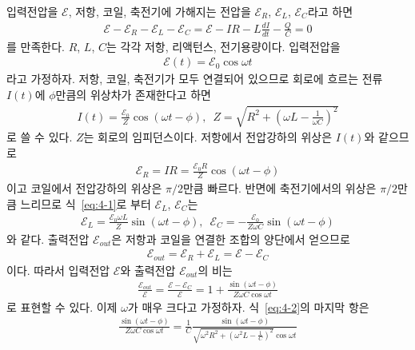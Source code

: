 \documentclass[tightenlines,floatfix,nofootinbib,superscriptaddress,fleqn]{revtex4}
\begin{document}
입력전압을 $\mathcal{E}$, 저항, 코일, 축전기에 가해지는 전압을 $\mathcal{E}_R$,
$\mathcal{E}_L$, $\mathcal{E}_C$라고 하면
\begin{align}\label{eq:4-1}
  \mathcal{E} - \mathcal{E}_R - \mathcal{E}_L - \mathcal{E}_C
  =\mathcal{E} - IR - L\frac{d I}{dt} -\frac{Q}{C}  =0
\end{align}
를 만족한다. $R$, $L$, $C$는 각각 저항, 리액턴스, 전기용량이다. 입력전압을
\begin{align}
  \mathcal{E}(t) = \mathcal{E}_0\cos\omega t
\end{align}
라고 가정하자. 저항, 코일, 축전기가 모두 연결되어 있으므로 회로에 흐르는 전류 $I(t)$에
$\phi$만큼의 위상차가 존재한다고 하면
\begin{align}
  I(t) = \frac{\mathcal{E}_0}{Z}\cos(\omega t-\phi),\,\,\,
  Z = \sqrt{R^2+\left(\omega L-\frac{1}{\omega C}\right)^2}
\end{align}
로 쓸 수 있다. $Z$는 회로의 임피던스이다. 저항에서 전압강하의 위상은 $I(t)$와 같으므로
\begin{align}
  \mathcal{E}_R = IR = \frac{\mathcal{E}_0 R}{Z}\cos(\omega t-\phi)
\end{align}
이고 코일에서 전압강하의 위상은 $\pi/2$만큼 빠르다. 반면에 축전기에서의 위상은 
$\pi/2$만큼 느리므로 식~\eqref{eq:4-1}로 부터
$\mathcal{E}_L$, $\mathcal{E}_C$는
\begin{align}
  \mathcal{E}_L = \frac{\mathcal{E}_0\omega L}{Z}\sin(\omega t-\phi) ,\,\,\,
  \mathcal{E}_C = -\frac{\mathcal{E}_0}{Z\omega C}\sin(\omega t-\phi) 
\end{align}
와 같다. 출력전압 $\mathcal{E}_{out}$은 저항과 코일을 연결한 조합의 양단에서 얻으므로
\begin{align}
  \mathcal{E}_{out} = \mathcal{E}_R+\mathcal{E}_L
  =\mathcal{E}-\mathcal{E}_C
\end{align}
이다. 따라서 입력전압 $\mathcal{E}$와 출력전압 $\mathcal{E}_{out}$의 비는
\begin{align}\label{eq:4-2}
  \frac{\mathcal{E}_{out}}{\mathcal{E}}
  =\frac{\mathcal{E}-\mathcal{E}_C}{\mathcal{E}}
  =1+\frac{\sin(\omega t-\phi)}{Z\omega C\cos\omega t}
\end{align}
로 표현할 수 있다. 이제 $\omega$가 매우 크다고 가정하자. 식~\eqref{eq:4-2}의 마지막 항은
\begin{align}
  \frac{\sin(\omega t-\phi)}{Z\omega C\cos\omega t}
  =\frac{1}{C}\frac{\sin(\omega t-\phi)}{\sqrt{\omega^2R^2
  +\left(\omega^2 L-\frac{1}{C}\right)^2}\cos\omega t}
\end{align}
\end{document}
